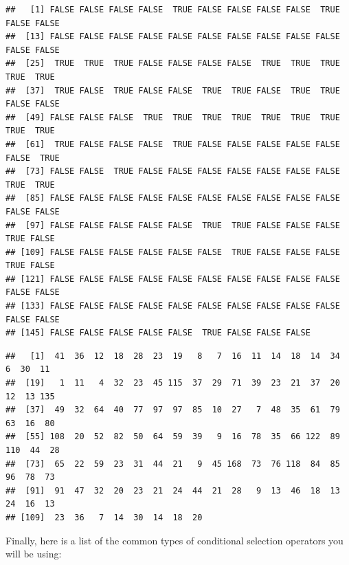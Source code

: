 \documentclass[
]{book}
\newenvironment{Shaded}{\begin{snugshade}}{\end{snugshade}}
\newcommand{\FunctionTok}[1]{\textcolor[rgb]{0.13,0.29,0.53}{\textbf{#1}}}
\newcommand{\NormalTok}[1]{#1}
\newcommand{\SpecialCharTok}[1]{\textcolor[rgb]{0.81,0.36,0.00}{\textbf{#1}}}
\begin{document}
\begin{verbatim}
##   [1] FALSE FALSE FALSE FALSE  TRUE FALSE FALSE FALSE FALSE  TRUE FALSE FALSE
##  [13] FALSE FALSE FALSE FALSE FALSE FALSE FALSE FALSE FALSE FALSE FALSE FALSE
##  [25]  TRUE  TRUE  TRUE FALSE FALSE FALSE FALSE  TRUE  TRUE  TRUE  TRUE  TRUE
##  [37]  TRUE FALSE  TRUE FALSE FALSE  TRUE  TRUE FALSE  TRUE  TRUE FALSE FALSE
##  [49] FALSE FALSE FALSE  TRUE  TRUE  TRUE  TRUE  TRUE  TRUE  TRUE  TRUE  TRUE
##  [61]  TRUE FALSE FALSE FALSE  TRUE FALSE FALSE FALSE FALSE FALSE FALSE  TRUE
##  [73] FALSE FALSE  TRUE FALSE FALSE FALSE FALSE FALSE FALSE FALSE  TRUE  TRUE
##  [85] FALSE FALSE FALSE FALSE FALSE FALSE FALSE FALSE FALSE FALSE FALSE FALSE
##  [97] FALSE FALSE FALSE FALSE FALSE  TRUE  TRUE FALSE FALSE FALSE  TRUE FALSE
## [109] FALSE FALSE FALSE FALSE FALSE FALSE  TRUE FALSE FALSE FALSE  TRUE FALSE
## [121] FALSE FALSE FALSE FALSE FALSE FALSE FALSE FALSE FALSE FALSE FALSE FALSE
## [133] FALSE FALSE FALSE FALSE FALSE FALSE FALSE FALSE FALSE FALSE FALSE FALSE
## [145] FALSE FALSE FALSE FALSE FALSE  TRUE FALSE FALSE FALSE
\end{verbatim}

\begin{Shaded}
\end{Shaded}

\begin{verbatim}
##   [1]  41  36  12  18  28  23  19   8   7  16  11  14  18  14  34   6  30  11
##  [19]   1  11   4  32  23  45 115  37  29  71  39  23  21  37  20  12  13 135
##  [37]  49  32  64  40  77  97  97  85  10  27   7  48  35  61  79  63  16  80
##  [55] 108  20  52  82  50  64  59  39   9  16  78  35  66 122  89 110  44  28
##  [73]  65  22  59  23  31  44  21   9  45 168  73  76 118  84  85  96  78  73
##  [91]  91  47  32  20  23  21  24  44  21  28   9  13  46  18  13  24  16  13
## [109]  23  36   7  14  30  14  18  20
\end{verbatim}

Finally, here is a list of the common types of conditional selection operators you will be using:
\end{document}
